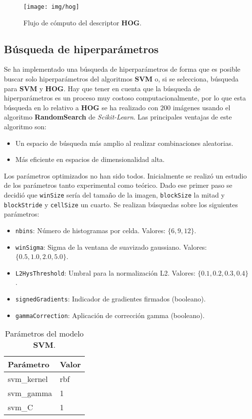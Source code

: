 \documentclass[12pt,letterpaper]{article}
\begin{document}
\begin{figure}[htp]
    \centering
    \texttt{[image: img/hog]}
    \caption{Flujo de cómputo del descriptor \textbf{HOG}.}
    \label{fig:hog}
\end{figure}

\subsection{Búsqueda de hiperparámetros}
Se ha implementado una búsqueda de hiperparámetros de forma que es posible buscar solo hiperparámetros del algoritmos \textbf{SVM} o, si se selecciona, búsqueda para \textbf{SVM} y \textbf{HOG}. Hay que tener en cuenta que la búsqueda de hiperparámetros es un proceso muy costoso computacionalmente, por lo que esta búsqueda en lo relativo a \textbf{HOG} se ha realizado con $200$ imágenes usando el algoritmo \textbf{RandomSearch} de \textit{Scikit-Learn}. Las principales ventajas de este algoritmo son:
\begin{itemize}
    \item Un espacio de búsqueda más amplio al realizar combinaciones aleatorias.
    \item Más eficiente en espacios de dimensionalidad alta.
\end{itemize}
Los parámetros optimizados no han sido todos. Inicialmente se realizó un estudio de los parámetros tanto experimental como teórico. Dado ese primer paso se decidió que \texttt{winSize} sería del tamaño de la imagen, \texttt{blockSize} la mitad y \texttt{blockStride} y \texttt{cellSize} un cuarto. Se realizan búsquedas sobre los siguientes parámetros:

\begin{itemize}
    \item \texttt{nbins}: Número de histogramas por celda. Valores: $\{6, 9, 12\}$.
    \item \texttt{winSigma}: Sigma de la ventana de suavizado gaussiano. Valores: $\{0.5, 1.0, 2.0, 5.0\}$.
    \item \texttt{L2HysThreshold}: Umbral para la normalización L2. Valores: $\{0.1, 0.2, 0.3, 0.4\}$.
    \item \texttt{signedGradients}: Indicador de gradientes firmados (booleano).
    \item \texttt{gammaCorrection}: Aplicación de corrección gamma (booleano).
\end{itemize}

\begin{table}[htp]
    \centering
    \begin{tabular}{ll}
    \hline
    \textbf{Parámetro} & \textbf{Valor} \\
    \hline
    svm\_kernel & rbf \\
    svm\_gamma & 1 \\
    svm\_C & 1 \\
    \hline
    \end{tabular}
    \caption{Parámetros del modelo \textbf{SVM}.}
    \label{tab:svm_params}
\end{table}
\end{document}
